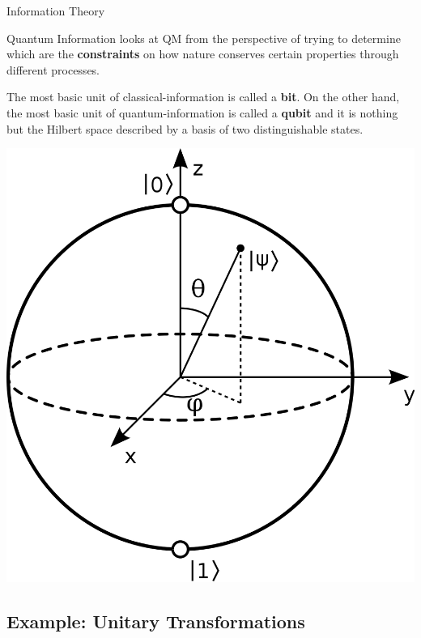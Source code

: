 \documentclass[9pt, handout, aspectratio=169]{beamer}		%
\begin{document}
	\begin{frame}{Information Theory}
	
		Quantum Information looks at QM from the perspective of trying to determine which are the \textbf{constraints} on how nature conserves certain properties through different processes. 
		
		\begin{multicols}{2}
			
			The most basic unit of classical-information is called a \textbf{bit}. On the other hand, the most basic unit of quantum-information is called a \textbf{qubit} and it is nothing but the Hilbert space described by a basis of two distinguishable states.
			
			\columnbreak
			\begin{center}
		\includegraphics[width=.26\paperwidth]{Figures/Bloch_Sphere}
			\end{center}
			
		\end{multicols}
		
	\end{frame}
	
	
	\subsection{Example: Unitary Transformations}
	
\end{document}
